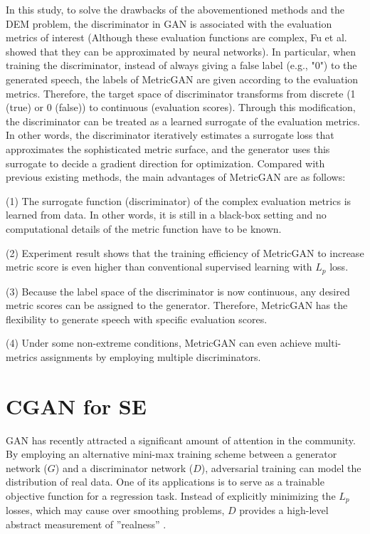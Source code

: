 \documentclass{article}
\begin{document}
 In this study, to solve the drawbacks of the abovementioned methods and the DEM problem, the discriminator in GAN is associated with the evaluation metrics of interest (Although these evaluation functions are complex, Fu et al.  showed that they can be approximated by neural networks). In particular, when training the discriminator, instead of always giving a false label (e.g., "0") to the generated speech, the labels of  MetricGAN are given according to the evaluation metrics. Therefore, the target space of discriminator transforms from discrete (1 (true) or 0 (false)) to continuous (evaluation scores). Through this modification, the discriminator can be treated as a learned surrogate of the evaluation metrics. In other words, the discriminator iteratively estimates a surrogate loss that approximates the sophisticated metric surface, and the generator uses this surrogate to decide a gradient
direction for optimization. Compared with previous existing methods, the main advantages of MetricGAN are as follows:
 
(1) The surrogate function (discriminator) of the complex evaluation metrics is learned from data. In other words, it is still in a black-box setting and no computational details of the metric function have to be known.

(2) Experiment result shows that the training efficiency of MetricGAN to increase metric score is even higher than conventional supervised learning with $L_{p}$ loss.

(3) Because the label space of the discriminator is now continuous, any desired metric scores can be assigned to the generator. Therefore, MetricGAN has the flexibility to generate speech with specific evaluation scores. 

(4) Under some non-extreme conditions, MetricGAN can even achieve multi-metrics assignments by employing multiple discriminators.




\section{CGAN for SE}
GAN has recently attracted a significant amount of attention in the community. By employing an alternative mini-max training scheme between a generator network ($G$) and a discriminator network ($D$), adversarial training can model the distribution of real data. One of its applications is to serve as a trainable objective function for a regression task. Instead of explicitly minimizing the $L_{p}$ losses, which may cause over smoothing problems, $D$ provides a high-level abstract measurement of ”realness” \cite{liao2018noise}. 
\end{document}
